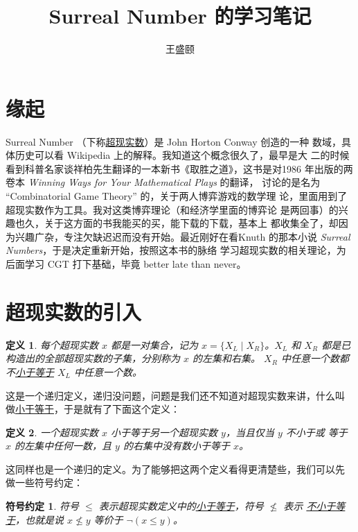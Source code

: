 \documentclass[cs4size,a4paper,adobefonts]{ctexart}
\newtheorem{defn}{定义}
\newcommand{\pname}[1]{\underline{#1}}
\numberwithin{equation}{section}
\begin{document}
\title{\bfseries Surreal Number 的学习笔记}
\author{王盛颐}
\date{}
\maketitle
\section*{缘起}

Surreal Number （下称\pname{超现实数}）是 John Horton Conway 创造的一种
数域，具体历史可以看 Wikipedia 上的解释。我知道这个概念很久了，最早是大
二的时候看到科普名家谈祥柏先生翻译的一本新书《取胜之道》，这书是对1986
年出版的两卷本 \textit{Winning Ways for Your Mathematical Plays} 的翻译，
讨论的是名为 ``Combinatorial Game Theory'' 的，关于两人博弈游戏的数学理
论，里面用到了超现实数作为工具。我对这类博弈理论（和经济学里面的博弈论
  是两回事）的兴趣也久，关于这方面的书我能买的买，能下载的下载，基本上
都收集全了，却因为兴趣广杂，专注欠缺迟迟而没有开始。最近刚好在看Knuth
的那本小说 \textit{Surreal Numbers}，于是决定重新开始，按照这本书的脉络
学习超现实数的相关理论，为后面学习 CGT 打下基础，毕竟 better late than
never。

\section{超现实数的引入}
\begin{defn}
  \label{defn:Surreal}
  每个超现实数 $x$ 都是一对集合，记为 $x=\{X_L \mid X_R\}$。$X_L$ 和
  $X_R$ 都是已构造出的全部超现实数的子集，分别称为 $x$ 的左集和右集。
  $X_R$ 中任意一个数都不\pname{小于等于} $X_L$ 中任意一个数。
\end{defn}

这是一个递归定义，递归没问题，问题是我们还不知道对超现实数来讲，什么叫
做\pname{小于等于}，于是就有了下面这个定义：

\begin{defn}
  \label{defn:Leq}
  一个超现实数 $x$ 小于等于另一个超现实数 $y$，当且仅当 $y$ 不小于或
  等于 $x$ 的左集中任何一数，且 $y$ 的右集中没有数小于等于 $x$。
\end{defn}

这同样也是一个递归的定义。为了能够把这两个定义看得更清楚些，我们可以先
做一些符号约定：

\newtheorem*{symbolDef}{符号约定}
\begin{symbolDef}
  符号 $\leq$ 表示超现实数定义中的\pname{小于等于}，符号 $\nleq$ 表示
  \pname{不小于等于}，也就是说 $x \nleq y$ 等价于 $\neg(x \leq y)$。
\end{symbolDef}
\end{document}
